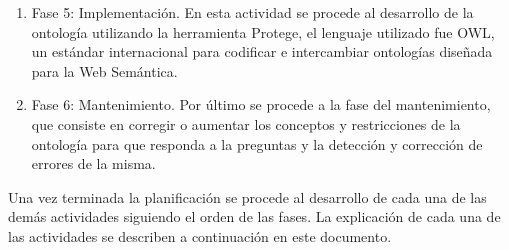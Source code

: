 \begin{enumerate}
\begin{enumerate}
\end{enumerate}
\item Fase 5: Implementación. En esta actividad se procede al desarrollo de la ontología utilizando la herramienta Protege, el lenguaje utilizado fue OWL, un estándar internacional para codificar e intercambiar ontologías diseñada para la Web Semántica. 

\item Fase 6: Mantenimiento. Por último se procede a la fase del mantenimiento, que consiste en corregir o aumentar los conceptos y restricciones de la ontología para que responda a la preguntas y la detección y corrección de errores de la misma. 		

\end{enumerate}
Una vez terminada la planificación se procede al desarrollo de cada una de las demás actividades siguiendo el orden de las fases. La explicación de cada una de las actividades se describen a continuación en este documento.
